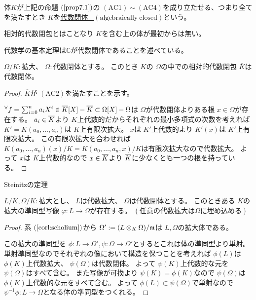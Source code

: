 \documentclass[../master_galois_theory]{subfiles}
\begin{document}
\begin{defi}
  体$K$が上記の命題 $(\mathrm{\ref{prop7.1}})$の $(\mathrm{AC}1) \sim (\mathrm{AC}4)$を成り立たせる、つまり全てを満たすとき
  $K$を\underline{代数閉体 \  $(\mathrm{algebraically \  closed})$}という。

  相対的代数閉包とはことなり $K$を含む上の体が最初からは無い。
\end{defi}

\begin{exam}
  代数学の基本定理は$\mathbb{C}$が代数閉体であることを述べている。
\end{exam}

\begin{prop}
  $\Omega/K:$拡大、 $\Omega :$代数閉体とする。
  このとき $K$の $\Omega$の中での相対的代数閉包 $\overline{K}$は代数閉体。
\end{prop}

\begin{proof}
  $\overline{K}$が $(\mathrm{AC}2)$を満たすことを示す。

  ${}^\forall f = \sum_{i=0}^n a_i X^i \in \overline{K}[X] - \overline{K} \subset \Omega[X] - \Omega$は
  $\Omega$が代数閉体よりある根 $x \in \Omega$が存在する。
  $a_i \in \overline{K}$より $K$上代数的だからそれぞれの最小多項式の次数を考えれば
  $K' = K(a_0 , \dots , a_n)$は $K$上有限次拡大。
  $x$は $K'$上代数的より
  $K'(x)$は $K'$上有限次拡大。
  この有限次拡大を合わせれば $K(a_0 , \dots , a_n)(x)/K = K(a_0 , \dots , a_n , x)/K$は有限次拡大なので代数拡大。
  よって $x$は $K$上代数的なので $x \in \overline{K}$より $\overline{K}$に少なくとも一つの根を持っている。
\end{proof}

\begin{theo} \label{theo:7.3}
  \rm{Steinitz}の定理

  $L/K , \Omega/K:$拡大とし、 $L$は代数拡大、 $\Omega$は代数閉体とする。
  このときある $K$の拡大の準同型写像 $\varphi : L \longrightarrow \Omega$が存在する。
  $(任意の代数拡大は \Omega に埋め込める)$
\end{theo}

\begin{proof}
  系 $(\mathrm{\ref{corl:scholium}})$から $\Omega' := (L \otimes_K \Omega)/\mathfrak{m}$は $L , \Omega$の拡大体である。

  この拡大の準同型を $\phi : L \longrightarrow \Omega' , \psi : \Omega \longrightarrow \Omega'$とするとこれは体の準同型より単射。
  単射準同型なのでそれぞれの像において構造を保つことを考えれば
  $\phi(L)$は $\phi(K)$上代数拡大、 $\psi(\Omega)$は代数閉体。
  よって $\psi(K)$上代数的な元を $\psi(\Omega)$はすべて含む。
  また写像が可換より $\psi(K) = \phi(K)$なので
  $\psi(\Omega)$は $\phi(K)$上代数的な元をすべて含む。
  よって $\phi(L) \subset \psi(\Omega)$で単射なので
  $\psi^{-1}\phi : L \longrightarrow \Omega$となる体の準同型をつくれる。
\end{proof}
\end{document}
